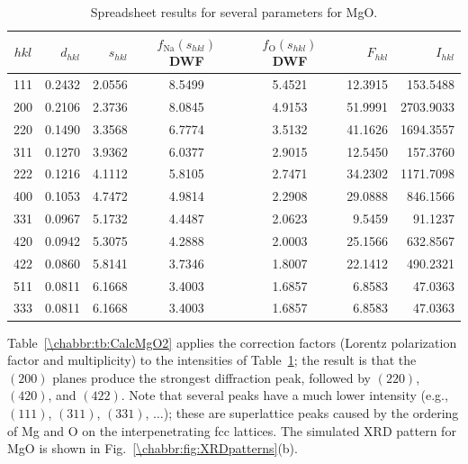 \begin{table}[h!]
\centering\leavevmode
{\small\begin{tabular}{|crrccrr|}
\hline
$hkl$& $d_{hkl}$ & $s_{hkl}$ & $f_\text{Na}(s_{hkl})$DWF & $f_\text{O}(s_{hkl})$DWF & $F_{hkl}$ & $I_{hkl}$\\
\hline\hline
111 & 0.2432 & 2.0556 & 8.5499 & 5.4521 & 12.3915 & 153.5488 \\
200 & 0.2106 & 2.3736 & 8.0845 & 4.9153 & 51.9991 & 2703.9033 \\
220 & 0.1490 & 3.3568 & 6.7774 & 3.5132 & 41.1626 & 1694.3557 \\
311 & 0.1270 & 3.9362 & 6.0377 & 2.9015 & 12.5450 & 157.3760 \\
222 & 0.1216 & 4.1112 & 5.8105 & 2.7471 & 34.2302 & 1171.7098 \\
400 & 0.1053 & 4.7472 & 4.9814 & 2.2908 & 29.0888 & 846.1566 \\
331 & 0.0967 & 5.1732 & 4.4487 & 2.0623 & 9.5459 & 91.1237 \\
420 & 0.0942 & 5.3075 & 4.2888 & 2.0003 & 25.1566 & 632.8567 \\
422 & 0.0860 & 5.8141 & 3.7346 & 1.8007 & 22.1412 & 490.2321 \\
511 & 0.0811 & 6.1668 & 3.4003 & 1.6857 & 6.8583 & 47.0363 \\
333 & 0.0811 & 6.1668 & 3.4003 & 1.6857 & 6.8583 & 47.0363 \\
\hline
\end{tabular}}
\caption{\label{\chabbr:tb:CalcMgO1}Spreadsheet results for several parameters for MgO.}
\end{table}

Table~\ref{\chabbr:tb:CalcMgO2} applies the correction factors (Lorentz polarization factor and multiplicity) to the intensities of Table~\ref{\chabbr:tb:CalcMgO1}; the result is that the $(200)$ planes produce the strongest diffraction peak, followed by $(220)$, $(420)$, and $(422)$. Note that several peaks have a much lower intensity (e.g., $(111)$, $(311)$, $(331)$, $\ldots$); these are superlattice peaks caused by the ordering of Mg and O on the interpenetrating fcc lattices.  The simulated XRD pattern for MgO is shown in Fig.~\ref{\chabbr:fig:XRDpatterns}(b).

